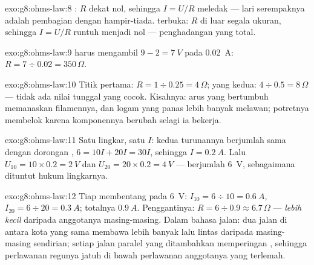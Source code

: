 \begin{solution}{exo:g8:ohms-law:8}
: $R$ dekat nol, sehingga $I = U/R$ meledak --- lari
serempaknya adalah pembagian dengan hampir-tiada.  terbuka: $R$
di luar segala ukuran, sehingga $I = U/R$ runtuh menjadi nol ---
penghadangan yang total.
\end{solution}

\begin{solution}{exo:g8:ohms-law:9}
 harus mengambil $9 - 2 = \qty{7}{V}$ pada \qty{0.02}{A}:
$R = 7 \div 0.02 = 350\,\Omega$.
\end{solution}

\begin{solution}{exo:g8:ohms-law:10}
Titik pertama: $R = 1 \div 0.25 = 4\,\Omega$; yang kedua: $4 \div
0.5 = 8\,\Omega$ --- tidak ada nilai tunggal yang cocok. Kisahnya:
arus yang bertumbuh memanaskan filamennya, dan logam yang panas lebih
banyak melawan; potretnya membelok karena komponennya berubah selagi
ia bekerja.
\end{solution}

\begin{solution}{exo:g8:ohms-law:11}
Satu lingkar, satu $I$: kedua turunannya berjumlah sama dengan
dorongan , $6 = 10 I + 20 I = 30 I$, sehingga $I = \qty{0.2}{A}$.
Lalu $U_{10}
= 10 \times 0.2 = \qty{2}{V}$ dan $U_{20} = 20 \times 0.2 =
\qty{4}{V}$ --- berjumlah \qty{6}{V}, sebagaimana dituntut hukum
lingkarnya.
\end{solution}

\begin{solution}{exo:g8:ohms-law:12}
Tiap  membentang pada \qty{6}{V}: $I_{10} = 6 \div 10 =
\qty{0.6}{A}$, $I_{20} = 6 \div 20 = \qty{0.3}{A}$; totalnya
$\qty{0.9}{A}$. Penggantinya: $R = 6 \div 0.9 \approx
6.7\,\Omega$ --- \emph{lebih kecil} daripada anggotanya masing-masing.
Dalam bahasa jalan: dua jalan di antara kota yang sama membawa lebih
banyak lalu lintas daripada masing-masing sendirian; setiap jalan
paralel yang ditambahkan memperingan , sehingga perlawanan
regunya jatuh di bawah perlawanan anggotanya yang terlemah.
\end{solution}

